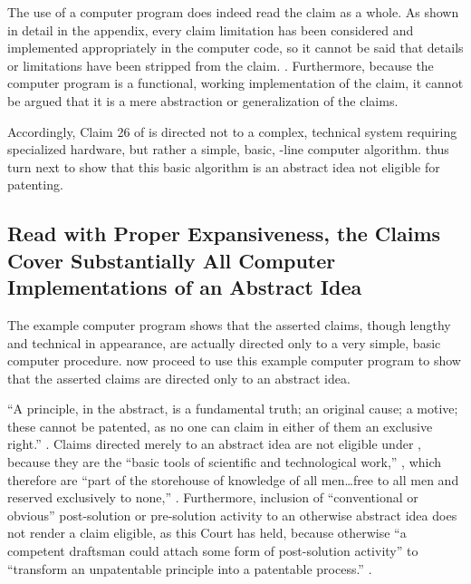 \documentclass{scotus}
\begin{document}
The use of a computer program does
indeed read the claim as a whole. As shown in detail in the appendix, every
claim limitation has been considered and implemented appropriately in the
computer code, so it cannot be said that details or limitations have been
stripped from the claim. . Furthermore,
because
the computer program is a functional, working implementation of the claim, it
cannot be argued that it is a mere abstraction or generalization of the claims.

Accordingly, Claim 26 of  is directed not to a complex, technical
system requiring specialized hardware, but rather a simple, basic,
\numlines-line computer algorithm. \Amici thus turn next to show that this
basic algorithm is an abstract idea not eligible for patenting.


%
%
\subsection{Read with Proper Expansiveness, the Claims Cover Substantially All
Computer Implementations of an Abstract Idea}

The example computer program shows that the asserted claims, though lengthy and
technical in appearance, are actually directed only to a very simple, basic
computer procedure. \Amici now proceed to use this example computer program to
show that the asserted claims are directed only to an abstract idea.

``A principle, in the abstract, is a fundamental truth; an original cause; a
motive; these cannot be patented, as no one can claim in either of them an
exclusive right.'' .
Claims directed merely to an abstract idea are
not eligible under , because they are the ``basic tools of
scientific and technological work,'' , which therefore
are ``part of the storehouse of knowledge of all men\ldots free to all men and
reserved exclusively to none,'' . Furthermore, inclusion of ``conventional or
obvious''
post-solution or pre-solution activity to an otherwise abstract idea does not
render a claim eligible, as this Court has held, because otherwise
``a competent draftsman could attach some form of post-solution activity'' to
``transform an unpatentable principle into a patentable process.''
.
\end{document}
